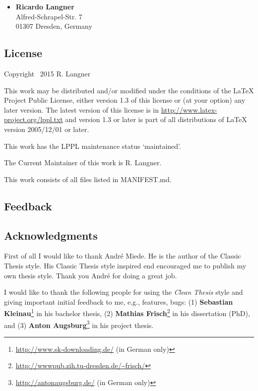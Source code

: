 \documentclass{ltxdockit}
\newcommand*{\cleanthesis}{\emph{Clean Thesis}\xspace}
\begin{document}
\begin{itemize}
\item \textbf{Ricardo Langner} \\
Alfred-Schrapel-Str. 7 \\
01307 Dresden, Germany
\end{itemize}

\subsection{License}
\label{sec:intro:license}

Copyright \textcopyright\ 2015 R. Langner

This work may be distributed and/or modified under the
conditions of the LaTeX Project Public License, either version 1.3
of this license or (at your option) any later version.
The latest version of this license is in
  \url{http://www.latex-project.org/lppl.txt}
and version 1.3 or later is part of all distributions of LaTeX
version 2005/12/01 or later.

This work has the LPPL maintenance status `maintained'.

The Current Maintainer of this work is R. Langner.

This work consists of all files listed in MANIFEST.md.

\subsection{Feedback}
\label{sec:intro:feedback}

\subsection{Acknowledgments}
\label{sec:intro:ack}

First of all I would like to thank André Miede. He is the author of the Classic Thesis style. His Classic Thesis style inspired end encouraged me to publish my own thesis style. Thank you André for doing a great job.

I would like to thank the following people for using the \cleanthesis style and giving important initial feedback to me, e.g., features, bugs: (1) \textbf{Sebastian Kleinau}\footnote{\url{http://www.sk-downloading.de/} (in German only)} in his bachelor thesis, (2) \textbf{Mathias Frisch}\footnote{\url{http://wwwpub.zih.tu-dresden.de/~frisch/}} in his dissertation (PhD), and (3) \textbf{Anton Augsburg}\footnote{\url{http://antonaugsburg.de/} (in German only)} in his project thesis.
\end{document}
